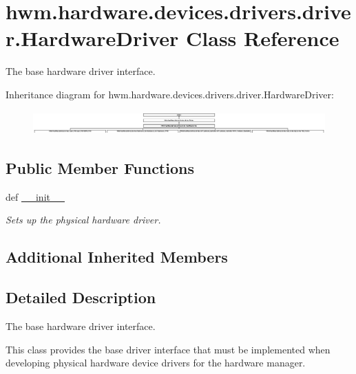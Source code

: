 \hypertarget{classhwm_1_1hardware_1_1devices_1_1drivers_1_1driver_1_1_hardware_driver}{\section{hwm.\-hardware.\-devices.\-drivers.\-driver.\-Hardware\-Driver Class Reference}
\label{classhwm_1_1hardware_1_1devices_1_1drivers_1_1driver_1_1_hardware_driver}
}


The base hardware driver interface.  


Inheritance diagram for hwm.\-hardware.\-devices.\-drivers.\-driver.\-Hardware\-Driver\-:\begin{figure}[H]
\begin{center}
\leavevmode
\includegraphics[height=0.913540cm]{classhwm_1_1hardware_1_1devices_1_1drivers_1_1driver_1_1_hardware_driver}
\end{center}
\end{figure}
\subsection*{Public Member Functions}
\begin{DoxyCompactItemize}
\item 
def \hyperlink{classhwm_1_1hardware_1_1devices_1_1drivers_1_1driver_1_1_hardware_driver_a4b24c27dadf55298f0e806a8f62b1096}{\-\_\-\-\_\-init\-\_\-\-\_\-}
\begin{DoxyCompactList}\small\item\em Sets up the physical hardware driver. \end{DoxyCompactList}\end{DoxyCompactItemize}
\subsection*{Additional Inherited Members}


\subsection{Detailed Description}
The base hardware driver interface. 

This class provides the base driver interface that must be implemented when developing physical hardware device drivers for the hardware manager. 

